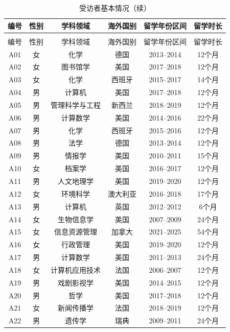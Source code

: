 \begin{longtable}{cccccc}
\caption{受访者基本情况} \label{tab:interviewees} \\
\toprule
编号 & 性别 & 学科领域 & 海外国别 & 留学年份区间 & 留学时长 \\
\midrule
\endfirsthead
\caption[]{受访者基本情况（续）} \\
\toprule
编号 & 性别 & 学科领域 & 海外国别 & 留学年份区间 & 留学时长 \\
\midrule
\endhead
\bottomrule
\endfoot
A01 & 女 & 化学 & 德国 & 2013--2014 & 12个月 \\
A02 & 女 & 图书馆学 & 美国 & 2017--2018 & 12个月 \\
A03 & 女 & 化学 & 西班牙 & 2015--2017 & 14个月 \\
A04 & 男 & 计算机 & 美国 & 2017--2018 & 12个月 \\
A05 & 男 & 管理科学与工程 & 新西兰 & 2018--2019 & 12个月 \\
A06 & 男 & 计算数学 & 美国 & 2014--2016 & 22个月 \\
A07 & 男 & 化学 & 西班牙 & 2015--2016 & 12个月 \\
A08 & 男 & 法学 & 德国 & 2013--2014 & 12个月 \\
A09 & 男 & 情报学 & 美国 & 2010--2011 & 15个月 \\
A10 & 女 & 档案学 & 美国 & 2016--2017 & 12个月 \\
A11 & 男 & 人文地理学 & 美国 & 2019--2020 & 12个月 \\
A12 & 女 & 环境科学 & 澳大利亚 & 2016--2018 & 17个月 \\
A13 & 男 & 计算机 & 英国 & 2012--2012 & 6个月 \\
A14 & 女 & 生物信息学 & 美国 & 2007--2009 & 24个月 \\
A15 & 女 & 信息资源管理 & 加拿大 & 2021--2025 & 54个月 \\
A16 & 女 & 行政管理 & 美国 & 2019--2020 & 12个月 \\
A17 & 男 & 计算数学 & 美国 & 2011--2013 & 24个月 \\
A18 & 女 & 计算机应用技术 & 法国 & 2006--2007 & 12个月 \\
A19 & 男 & 戏剧影视学 & 美国 & 2014--2015 & 12个月 \\
A20 & 男 & 哲学 & 美国 & 2017--2018 & 12个月 \\
A21 & 女 & 新闻传播学 & 法国 & 2018--2019 & 12个月 \\
A22 & 男 & 遗传学 & 瑞典 & 2009--2011 & 24个月 \\
\end{longtable}

